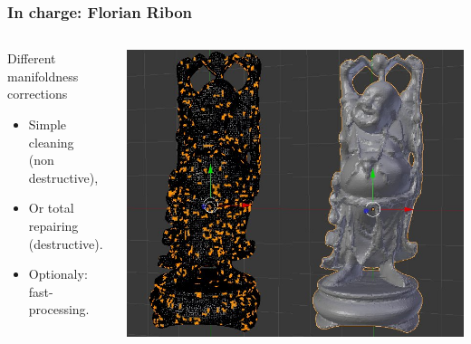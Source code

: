 \documentclass{beamer}
\begin{document}
\begin{frame}
	\frametitle{In charge: Florian Ribon}

    \begin{columns}[t]
  	\begin{column}{5cm}
        \begin{block}{Different manifoldness corrections}
		    \begin{itemize}
			    \item Simple cleaning\\\small(non destructive),
			    \item Or total repairing\\\small(destructive).
			    \item Optionaly: fast-processing.
		    \end{itemize}
        \end{block}
    \end{column}

    \begin{column}{6cm}
        \begin{center}
		    \includegraphics[height=.7\textheight]{repair}
	    \end{center}
    \end{column}

    \end{columns}
\end{frame}
\end{document}
